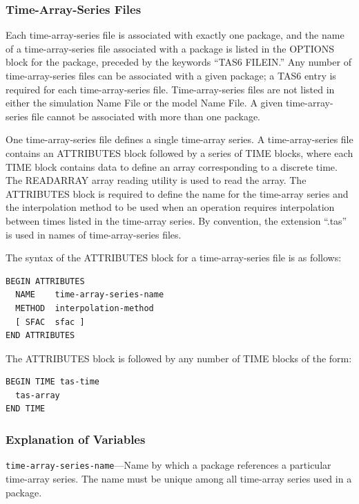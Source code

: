 \subsubsection{Time-Array-Series Files}

Each time-array-series file is associated with exactly one package, and the name of a time-array-series file associated with a package is listed in the OPTIONS block for the package, preceded by the keywords ``TAS6 FILEIN.'' Any number of time-array-series files can be associated with a given package; a TAS6 entry is required for each time-array-series file. Time-array-series files are not listed in either the simulation Name File or the model Name File. A given time-array-series file cannot be associated with more than one package.

One time-array-series file defines a single time-array series. A time-array-series file contains an ATTRIBUTES block followed by a series of TIME blocks, where each TIME block contains data to define an array corresponding to a discrete time. The READARRAY array reading utility is used to read the array. The ATTRIBUTES block is required to define the name for the time-array series and the interpolation method to be used when an operation requires interpolation between times listed in the time-array series.  By convention, the extension ``.tas'' is used in names of time-array-series files.

The syntax of the ATTRIBUTES block for a time-array-series file is as follows:

\begin{lstlisting}[style=blockdefinition]
BEGIN ATTRIBUTES
  NAME    time-array-series-name
  METHOD  interpolation-method
  [ SFAC  sfac ]
END ATTRIBUTES
\end{lstlisting}

The ATTRIBUTES block is followed by any number of TIME blocks of the form:\\
\begin{lstlisting}[style=blockdefinition]
BEGIN TIME tas-time  
  tas-array
END TIME
\end{lstlisting}

\subsubsection{Explanation of Variables}

\begin{description}
\item \texttt{time-array-series-name}---Name by which a package references a particular time-array series. The name must be unique among all time-array series used in a package.
\end{description}

